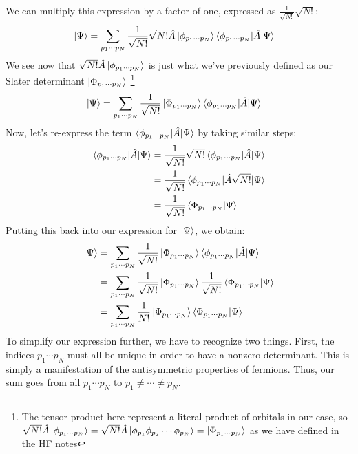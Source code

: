 \documentclass{article}
\begin{document}
We can multiply this expression by a factor of one, expressed as $\frac{1}{\sqrt{N!}} \sqrt{N!}$: 
\begin{align*}
\ket{\Psi} &=\sum_{p_1 \cdots p_N}  \frac{1}{\sqrt{N!}} \sqrt{N!} \hat{A} \ket{\phi_{p_1 \cdots p_N}} \braket{\phi_{p_1 \cdots p_N} | \hat{A} | \Psi} 
\end{align*}
We see now that $\sqrt{N!} \hat{A} \ket{\phi_{p_1 \cdots p_N}}$ is just what we've previously defined as our Slater determinant $\ket{\Phi_{p_1 \cdots p_N}}$
\footnote{The tensor product here represent a literal product of orbitals in our case, so $\sqrt{N!} \hat{A} \ket{\phi_{p_1 \cdots p_N}} = \sqrt{N!} \hat{A} \ket{\phi_{p_1}\phi_{p_2} \cdots \phi_{p_N}} = \ket{\Phi_{p_1 \cdots p_N}}$ as we have defined in the HF notes}
\begin{align*}
\ket{\Psi} &=\sum_{p_1 \cdots p_N}  \frac{1}{\sqrt{N!}} \ket{\Phi_{p_1 \cdots p_N}} \braket{\phi_{p_1 \cdots p_N} | \hat{A} | \Psi} 
\end{align*}
Now, let's re-express the term $ \braket{\phi_{p_1 \cdots p_N} | \hat{A} | \Psi} $ by taking similar steps: 
\begin{align*}
\braket{\phi_{p_1 \cdots p_N} | \hat{A} | \Psi} &=  \frac{1}{\sqrt{N!}} {\sqrt{N!}} \braket{\phi_{p_1 \cdots p_N} | \hat{A} | \Psi}  \\
&=  \frac{1}{\sqrt{N!}}\braket{\phi_{p_1 \cdots p_N} | \hat{A}  {\sqrt{N!}}  | \Psi}  \\
&= \frac{1}{\sqrt{N!}}\braket{\Phi_{p_1 \cdots p_N} | \Psi}  
\end{align*}
Putting this back into our expression for $\ket{\Psi}$, we obtain: 
\begin{align*}
\ket{\Psi} &=\sum_{p_1 \cdots p_N}  \frac{1}{\sqrt{N!}} \ket{\Phi_{p_1 \cdots p_N}} \braket{\phi_{p_1 \cdots p_N} | \hat{A} | \Psi}  \\
 &=\sum_{p_1 \cdots p_N}  \frac{1}{\sqrt{N!}} \ket{\Phi_{p_1 \cdots p_N}}\frac{1}{\sqrt{N!}}\braket{\Phi_{p_1 \cdots p_N} | \Psi}   \\
&=\sum_{p_1 \cdots p_N}  \frac{1}{N!} \ket{\Phi_{p_1 \cdots p_N}}\braket{\Phi_{p_1 \cdots p_N} | \Psi}   \\
\end{align*}
To simplify our expression further, we have to recognize two things. 
First, the indices $p_1 \cdots p_N$ must all be unique in order to have a nonzero determinant. 
This is simply a manifestation of the antisymmetric properties of fermions. 
Thus, our sum goes from all $p_1 \cdots p_N$ to $p_1 \neq \cdots \neq p_N$. 
\end{document}

